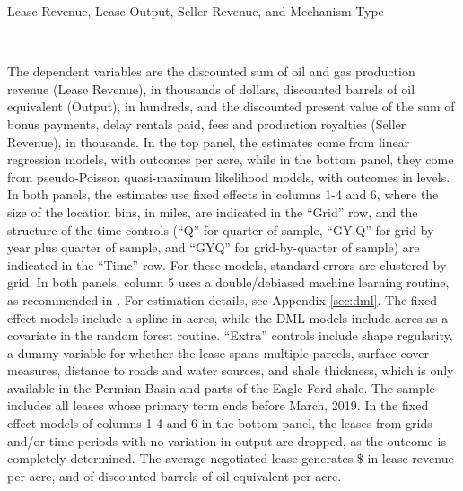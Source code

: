 \addtolength{\tabcolsep}{4pt}
\begin{table}[htpb]
	\caption{Lease Revenue, Lease Output, Seller Revenue, and Mechanism Type \label{tab:output_stacked}}
	\begin{threeparttable}
	\small
	 \\
		\begin{tablenotes}
		\footnotesize
		\item The dependent variables are the discounted sum of oil and gas production revenue (Lease Revenue), in thousands of dollars, discounted barrels of oil equivalent (Output), in hundreds, and the discounted present value of the sum of bonus payments, delay rentals paid, fees and production royalties (Seller Revenue), in thousands.  In the top panel, the estimates come from linear regression models, with outcomes per acre, while in the bottom panel, they come from pseudo-Poisson quasi-maximum likelihood models, with outcomes in levels.  In both panels, the estimates use fixed effects in columns 1-4 and 6, where the size of the location bins, in miles, are indicated in the ``Grid'' row, and the structure of the time controls (``Q'' for quarter of sample, ``GY,Q'' for grid-by-year plus quarter of sample, and ``GYQ'' for grid-by-quarter of sample) are indicated in the ``Time'' row.  For these models, standard errors are clustered by grid.  In both panels, column 5 uses a double/debiased machine learning routine, as recommended in  \cite{chernozhukov2018double}.  For estimation details, see Appendix \ref{sec:dml}.  The fixed effect models include a spline in acres, while the DML models include acres as a covariate in the random forest routine. ``Extra'' controls include shape regularity, a dummy variable for whether the lease spans multiple parcels, surface cover measures, distance to roads and water sources, and shale thickness, which is only available in the Permian Basin and parts of the Eagle Ford shale.  The sample includes all leases whose primary term ends before March, 2019.  In the fixed effect models of columns 1-4 and 6 in the bottom panel, the leases from grids and/or time periods with no variation in output are dropped, as the outcome is completely determined.  The average negotiated lease generates \$ in lease revenue per acre, and  of discounted barrels of oil equivalent per acre.    
		\end{tablenotes}	   
	\end{threeparttable}
\end{table}
\addtolength{\tabcolsep}{-4pt}

